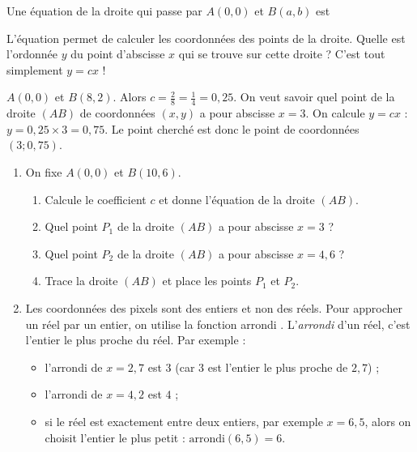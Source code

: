 \documentclass[class=report,crop=false, 12pt]{standalone}
\begin{document}
\begin{activite}

Une équation de la droite qui passe par $A(0,0)$ et $B(a,b)$ est 

L'équation permet de calculer les coordonnées des points de la droite.
Quelle est l'ordonnée $y$ du point d'abscisse $x$ qui se trouve sur cette droite ? C'est tout simplement $y=cx$ !

\bigskip
\begin{exemple}
$A(0,0)$ et $B(8,2)$. Alors $c = \frac{2}{8} = \frac14 = 0,25$.
On veut savoir quel point de la droite $(AB)$ de coordonnées $(x,y)$ a pour abscisse $x=3$. On calcule 
$y=cx$ : $y = 0,25 \times 3 = 0,75$. Le point cherché est donc le point de coordonnées $(3 ; 0,75)$.

\end{exemple}


\bigskip

\begin{enumerate}
   \item On fixe $A(0,0)$ et $B(10,6)$.
   \begin{enumerate}
     \item Calcule le coefficient $c$ et donne l'équation de la droite $(AB)$.
     \item Quel point $P_1$ de la droite $(AB)$ a pour abscisse $x=3$ ?
     \item Quel point $P_2$ de la droite $(AB)$ a pour abscisse $x=4,6$ ?  
     \item Trace la droite $(AB)$ et place les points $P_1$ et $P_2$.   
   \end{enumerate}
  
  
    \item Les coordonnées des pixels sont des entiers et non des réels. Pour approcher un réel par un entier, on utilise la fonction \og arrondi \fg{}. L'\emph{arrondi} d'un réel, c'est l'entier le plus proche du réel. Par exemple :
\begin{itemize}
  \item l'arrondi de $x=2,7$ est $3$ (car $3$ est l'entier le plus proche de $2,7$) ;
  \item l'arrondi de $x=4,2$ est $4$ ;
  \item si le réel est exactement entre deux entiers, par exemple $x=6,5$, alors on choisit l'entier le plus petit : $\text{arrondi}(6,5)=6$.    
\end{itemize}    
      

\end{enumerate}
\end{activite}
\end{document}
